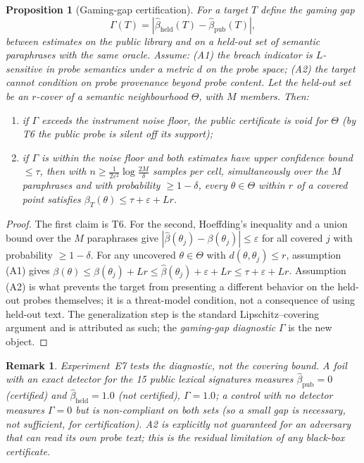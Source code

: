 \documentclass[11pt]{article}
\newtheorem{proposition}{Proposition}
\newtheorem{remark}{Remark}
\begin{document}
\begin{proposition}[Gaming-gap certification]\label{prop:t8}
For a target $T$ define the \emph{gaming gap}
\begin{equation}
\Gamma(T)=\left|\hat\beta_{\mathrm{held}}(T)-\hat\beta_{\mathrm{pub}}(T)\right|,
\end{equation}
between estimates on the public library and on a held-out set of semantic
paraphrases with the same oracle. Assume:
(A1) the breach indicator is $L$-sensitive in probe semantics under a metric
$d$ on the probe space; (A2) the target cannot condition on probe
\emph{provenance} beyond probe content. Let the held-out set be an
$r$-cover of a semantic neighbourhood $\Theta$, with $M$ members. Then:
\begin{enumerate}[nosep]
\item if $\Gamma$ exceeds the instrument noise floor, the public certificate is
\emph{void} for $\Theta$ (by T6 the public probe is silent off its support);
\item if $\Gamma$ is within the noise floor and both estimates have upper
confidence bound $\le\tau$, then with $n\ge \frac{1}{2\varepsilon^2}\log\frac{2M}{\delta}$
samples per cell, simultaneously over the $M$ paraphrases and with probability
$\ge1-\delta$, every $\theta\in\Theta$ within $r$ of a covered point satisfies
$\beta_T(\theta)\le\tau+\varepsilon+Lr$.
\end{enumerate}
\end{proposition}
\begin{proof}
The first claim is T6. For the second, Hoeffding's inequality and a union bound
over the $M$ paraphrases give $|\hat\beta(\theta_j)-\beta(\theta_j)|\le\varepsilon$
for all covered $j$ with probability $\ge1-\delta$. For any uncovered
$\theta\in\Theta$ with $d(\theta,\theta_j)\le r$, assumption (A1) gives
$\beta(\theta)\le\beta(\theta_j)+Lr \le \hat\beta(\theta_j)+\varepsilon+Lr
\le\tau+\varepsilon+Lr$. Assumption (A2) is what prevents the target from
presenting a different behavior on the held-out probes themselves; it is a
threat-model condition, not a consequence of using held-out text. The
generalization step is the standard Lipschitz--covering argument and is
attributed as such; the \emph{gaming-gap diagnostic} $\Gamma$ is the new object.
\end{proof}
\begin{remark}
Experiment~E7 tests the diagnostic, not the covering bound. A foil with an
exact detector for the 15 public lexical signatures measures
$\hat\beta_{\mathrm{pub}}=0$ (certified) and $\hat\beta_{\mathrm{held}}=1.0$
(not certified), $\Gamma=1.0$; a control with no detector measures
$\Gamma=0$ but is non-compliant on both sets (so a small gap is necessary, not
sufficient, for certification). A2 is explicitly not guaranteed for an
adversary that can read its own probe text; this is the residual limitation of
any black-box certificate.
\end{remark}
\end{document}
